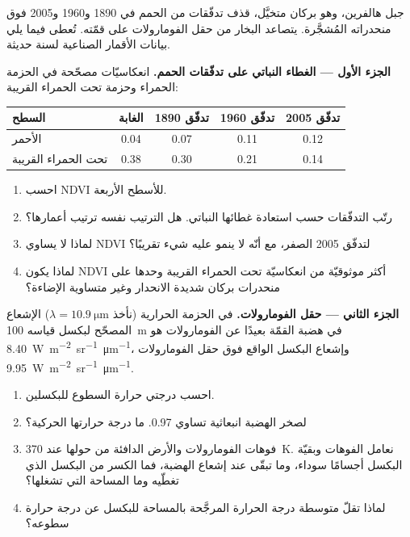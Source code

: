 \begin{problem}
\label{pb:b3:remote-sensing-gis:1}
جبل هالفرين، وهو بركان متخيَّل، قذف تدفّقات من الحمم في 1890 و1960
و2005 فوق منحدراته المُشجَّرة. يتصاعد البخار من حقل الفومارولات على قمّته.
تُعطى فيما يلي بيانات الأقمار الصناعية لسنة حديثة.

\medskip\noindent\textbf{الجزء الأول --- الغطاء النباتي على تدفّقات الحمم.} انعكاسيّات مصحّحة
في الحزمة الحمراء وحزمة تحت الحمراء القريبة:
\begin{center}
\small
\begin{tabular}{lcccc}
\hline
السطح & الغابة & تدفّق 1890 & تدفّق 1960 & تدفّق 2005 \\
\hline
الأحمر & 0.04 & 0.07 & 0.11 & 0.12 \\
تحت الحمراء القريبة & 0.38 & 0.30 & 0.21 & 0.14 \\
\hline
\end{tabular}
\end{center}
\begin{enumerate}
\item احسب NDVI للأسطح الأربعة.
\item رتّب التدفّقات حسب استعادة غطائها النباتي. هل الترتيب
  نفسه ترتيب أعمارها؟
\item لماذا لا يساوي NDVI لتدفّق 2005 الصفر، مع أنّه لا ينمو عليه
  شيء تقريبًا؟
\item لماذا يكون NDVI أكثر موثوقيّة من انعكاسيّة تحت الحمراء القريبة
  وحدها على منحدرات بركان شديدة الانحدار وغير متساوية الإضاءة؟
\end{enumerate}

\medskip\noindent\textbf{الجزء الثاني --- حقل الفومارولات.} في الحزمة الحرارية
(نأخذ $\lambda = \qty{10.9}{\micro\metre}$) الإشعاع المصحّح لبكسل
قياسه \qty{100}{m} في هضبة القمّة بعيدًا عن الفومارولات هو
\qty{8.40}{W.m^{-2}.sr^{-1}.\micro\metre^{-1}}، وإشعاع البكسل الواقع فوق
حقل الفومارولات \qty{9.95}{W.m^{-2}.sr^{-1}.\micro\metre^{-1}}.
\begin{enumerate}[resume]
\item احسب درجتي حرارة السطوع للبكسلين.
\item لصخر الهضبة انبعاثية تساوي 0.97. ما درجة حرارتها
  الحركية؟
\item فوهات الفومارولات والأرض الدافئة من حولها عند
  \qty{370}{K}. نعامل الفوهات وبقيّة البكسل أجسامًا سوداء،
  وما تبقّى عند إشعاع الهضبة، فما الكسر من البكسل الذي تغطّيه
  وما المساحة التي تشغلها؟
\item لماذا تقلّ متوسطة درجة الحرارة المرجَّحة بالمساحة للبكسل
  عن درجة حرارة سطوعه؟
\end{enumerate}


\end{problem}
